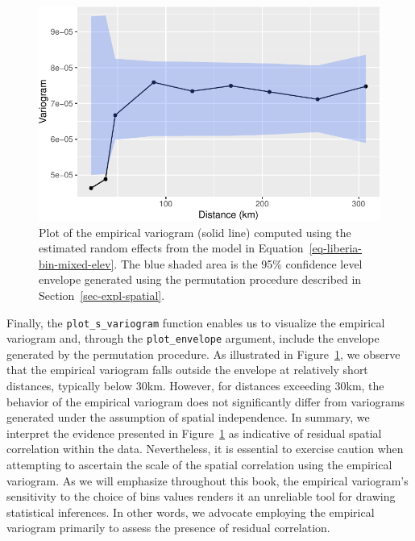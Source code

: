 \documentclass[
  letterpaper,
]{krantz}
\begin{document}
\begin{figure}[H]

{\centering \includegraphics{03_model-fitting_files/figure-pdf/fig-liberia-variog-1.pdf}

}

\caption{\label{fig-liberia-variog}Plot of the empirical variogram
(solid line) computed using the estimated random effects from the model
in Equation~\ref{eq-liberia-bin-mixed-elev}. The blue shaded area is the
95\% confidence level envelope generated using the permutation procedure
described in Section~\ref{sec-expl-spatial}.}

\end{figure}

Finally, the \texttt{plot\_s\_variogram} function enables us to
visualize the empirical variogram and, through the
\texttt{plot\_envelope} argument, include the envelope generated by the
permutation procedure. As illustrated in
Figure~\ref{fig-liberia-variog}, we observe that the empirical variogram
falls outside the envelope at relatively short distances, typically
below 30km. However, for distances exceeding 30km, the behavior of the
empirical variogram does not significantly differ from variograms
generated under the assumption of spatial independence. In summary, we
interpret the evidence presented in Figure~\ref{fig-liberia-variog} as
indicative of residual spatial correlation within the data.
Nevertheless, it is essential to exercise caution when attempting to
ascertain the scale of the spatial correlation using the empirical
variogram. As we will emphasize throughout this book, the empirical
variogram's sensitivity to the choice of bins values renders it an
unreliable tool for drawing statistical inferences. In other words, we
advocate employing the empirical variogram primarily to assess the
presence of residual correlation.
\end{document}
